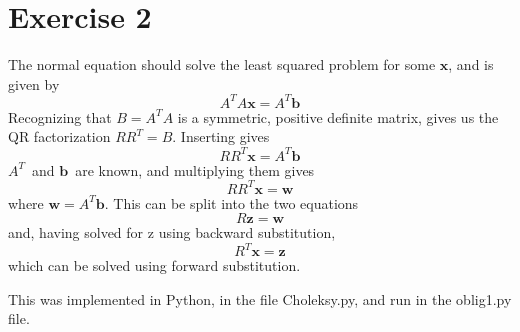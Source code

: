 \documentclass[12p,a4paper]{article}
\renewcommand{\b}{\boldsymbol}
\begin{document}
\section*{Exercise 2}
The normal equation should solve the least squared problem for some $\b x$, and is given by
\[
    A^TA\b x = A^T\b b
\]
Recognizing that $B = A^TA$ is a symmetric, positive definite matrix, gives us the QR factorization $RR^T = B$. Inserting gives
\[
    RR^T\b x = A^T \b b
\]
$A^T$ and $\b b$ are known, and multiplying them gives
\[
    RR^T\b x = \b w
\]
where $\b w = A^T\b b$. This can be split into the two equations
\[
    R\b z = \b w
\]
and, having solved for z using backward substitution,
\[
    R^T\b x = \b z
\]
which can be solved using forward substitution.

This was implemented in Python, in the file Choleksy.py, and run in the oblig1.py file.
\end{document}
